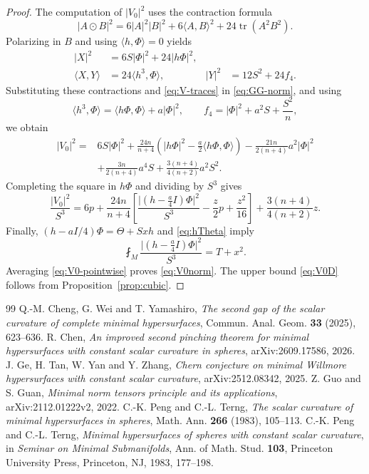 \documentclass[10pt,a4paper]{amsart}
\numberwithin{equation}{section}
\newcommand{\tr}{\operatorname{tr}}
\newcommand{\ip}[2]{\langle #1,#2\rangle}
\newcommand{\norm}[1]{\lvert #1\rvert}
\begin{document}
\begin{proof}
The computation of $\norm{V_0}^2$ uses the contraction formula
\[
\norm{A\odot B}^2
=6\norm A^2\norm B^2+6\ip AB^2+24\tr(A^2B^2).
\]
Polarizing in $B$ and using $\ip h\Phi=0$ yields
\[
\begin{aligned}
\norm X^2&=6S\norm\Phi^2+24\norm{h\Phi}^2,\\
\ip XY&=24\ip{h^3}{\Phi},
&\norm Y^2&=12S^2+24f_4.
\end{aligned}
\]
Substituting these contractions and \eqref{eq:V-traces} in \eqref{eq:GG-norm}, and using
\[
\ip{h^3}{\Phi}=\ip{h\Phi}{\Phi}+a\norm\Phi^2,
\qquad f_4=\norm\Phi^2+a^2S+\frac{S^2}{n},
\]
we obtain
\begin{align*}
\norm{V_0}^2
={}&6S\norm\Phi^2
+\frac{24n}{n+4}\left(\norm{h\Phi}^2-\frac a2\ip{h\Phi}{\Phi}\right)
-\frac{21n}{2(n+4)}a^2\norm\Phi^2\\
&+\frac{3n}{2(n+4)}a^4S
+\frac{3(n+4)}{4(n+2)}a^2S^2.
\end{align*}
Completing the square in $h\Phi$ and dividing by $S^3$ gives
\begin{equation}\label{eq:V0-pointwise}
\frac{\norm{V_0}^2}{S^3}
=6p+\frac{24n}{n+4}
\left[\frac{\norm{(h-\frac a4I)\Phi}^2}{S^3}
-\frac z2p+\frac{z^2}{16}\right]
+\frac{3(n+4)}{4(n+2)}z.
\end{equation}
Finally, $(h-aI/4)\Phi=\Theta+Sxh$ and \eqref{eq:hTheta} imply
\[
\fint_M\frac{\norm{(h-\frac a4I)\Phi}^2}{S^3}=T+x^2.
\]
Averaging \eqref{eq:V0-pointwise} proves \eqref{eq:V0norm}.
The upper bound \eqref{eq:V0D} follows from Proposition~\ref{prop:cubic}.
\end{proof}

\begin{thebibliography}{99}
 Q.-M. Cheng, G. Wei and T. Yamashiro, \emph{The second gap of the scalar curvature of complete minimal hypersurfaces}, Commun. Anal. Geom. \textbf{33} (2025), 623--636.
 R. Chen, \emph{An improved second pinching theorem for minimal hypersurfaces with constant scalar curvature in spheres}, arXiv:2609.17586, 2026.
 J. Ge, H. Tan, W. Yan and Y. Zhang, \emph{Chern conjecture on minimal Willmore hypersurfaces with constant scalar curvature}, arXiv:2512.08342, 2025.
 Z. Guo and S. Guan, \emph{Minimal norm tensors principle and its applications}, arXiv:2112.01222v2, 2022.
 C.-K. Peng and C.-L. Terng, \emph{The scalar curvature of minimal hypersurfaces in spheres}, Math. Ann. \textbf{266} (1983), 105--113.
 C.-K. Peng and C.-L. Terng, \emph{Minimal hypersurfaces of spheres with constant scalar curvature}, in \emph{Seminar on Minimal Submanifolds}, Ann. of Math. Stud. \textbf{103}, Princeton University Press, Princeton, NJ, 1983, 177--198.
\end{thebibliography}
\end{document}
